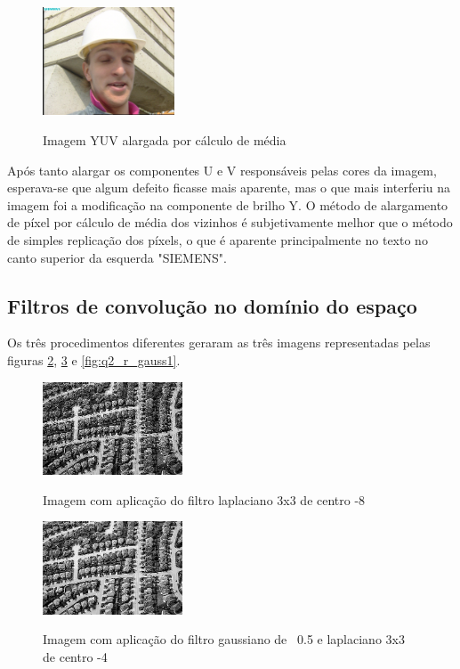 \documentclass[conference]{IEEEtran}
\begin{document}
\begin{figure}
    \centering
    \includegraphics[width=0.35\textwidth]{imgs/Q1-3 YUV to RGB large.png}
    \caption\scriptsize{Imagem YUV alargada por cálculo de média}
    \label{fig:q1_r_average}
\end{figure}

Após tanto alargar os componentes U e V responsáveis pelas cores da imagem, esperava-se que algum defeito ficasse mais aparente, mas o que mais interferiu na imagem foi a modificação na componente de brilho Y. O método de alargamento de píxel por cálculo de média dos vizinhos é subjetivamente melhor que o método de simples replicação dos píxels, o que é aparente principalmente no texto no canto superior da esquerda "SIEMENS".


\subsection{Filtros de convolução no domínio do espaço}

Os três procedimentos diferentes geraram as três imagens representadas pelas figuras \ref{fig:q2_r_laplace-8}, \ref{fig:q2_r_gaussHalf} e \ref{fig:q2_r_gauss1}.

\begin{figure}
    \centering
    \includegraphics[width=0.37\textwidth]{imgs/Q2-3 LaPlace added (k 3x3 c-8).png}
    \caption\scriptsize{Imagem com aplicação do filtro laplaciano 3x3 de centro -8}
    \label{fig:q2_r_laplace-8}
\end{figure}

\begin{figure}
    \centering
    \includegraphics[width=0.37\textwidth]{imgs/Q2-5 Gauss LaPlace added (3x3 sigma 0.5 k 3x3 c-4).png}
    \caption\scriptsize{Imagem com aplicação do filtro gaussiano de \textsigma\ 0.5 e laplaciano 3x3 de centro -4}
    \label{fig:q2_r_gaussHalf}
\end{figure}
\end{document}
